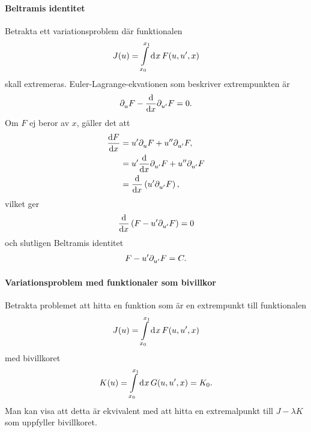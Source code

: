 \paragraph{Beltramis identitet}
Betrakta ett variationsproblem där funktionalen
\begin{align*}
	J(u) = \int\limits_{x_{0}}^{x_{1}}\dd[]{x}F(u, u', x)
\end{align*}
skall extremeras. Euler-Lagrange-ekvationen som beskriver extrempunkten är
\begin{align*}
	\partial_{u}^{}F - \dv{x}\partial_{u'}^{}F = 0.
\end{align*}
Om $F$ ej beror av $x$, gäller det att
\begin{align*}
	\dv{F}{x}           &= u'\partial_{u}^{}F + u''\partial_{u'}^{}F, \\
	                    &= u'\dv{x}\partial_{u'}^{}F + u''\partial_{u'}^{}F \\
	                    &= \dv{x}\left(u'\partial_{u'}^{}F\right),
\end{align*}
vilket ger
\begin{align*}
	\dv{x}\left(F - u'\partial_{u'}^{}F\right) = 0
\end{align*}
och slutligen Beltramis identitet
\begin{align*}
	F - u'\partial_{u'}^{}F = C.
\end{align*}

\paragraph{Variationsproblem med funktionaler som bivillkor}
Betrakta problemet att hitta en funktion som är en extrempunkt till funktionalen
\begin{align*}
	J(u) = \int\limits_{x_{0}}^{x_{1}}\dd[]{x}F(u, u', x)
\end{align*}
med bivillkoret
\begin{align*}
	K(u) = \int\limits_{x_{0}}^{x_{1}}\dd[]{x}G(u, u', x) = K_{0}.
\end{align*}
Man kan visa att detta är ekvivalent med att hitta en extremalpunkt till $J - \lambda K$ som uppfyller bivillkoret.
